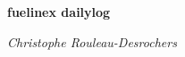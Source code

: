\thispagestyle{empty}

\begin{center}
	\vfill
    \vspace*{0.4\textheight}

	\Huge
	\bf{fuelinex dailylog}
    
	\Large
	\it{Christophe Rouleau-Desrochers}
	
    \normalsize
    
\end{center}